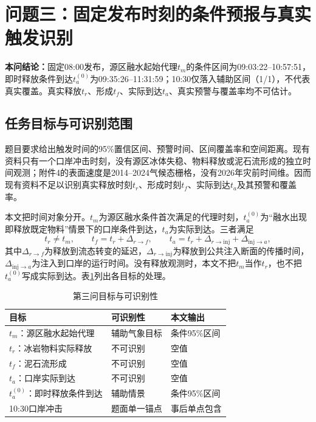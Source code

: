 \section{问题三：固定发布时刻的条件预报与真实触发识别}
\noindent\textbf{本问结论：}固定08:00发布，源区融水起始代理$t_m$的条件区间为09:03:22--10:57:51，即时释放条件到达$t_a^{(0)}$为09:35:26--11:31:59；10:30仅落入辅助区间（1/1），不代表真实覆盖。真实释放$t_r$、形成$t_f$、实际到达$t_a$、真实预警与覆盖率均不可估计。

\subsection{任务目标与可识别范围}
题目要求给出触发时间的95\%置信区间、预警时间、区间覆盖率和空间距离。现有资料只有一个口岸冲击时刻，没有源区冰体失稳、物料释放或泥石流形成的独立时间观测；附件4的表面速度是2014--2024气候态栅格，没有2026年灾前时间维。因而现有资料不足以识别真实释放时刻$t_r$、形成时刻$t_f$、实际到达$t_a$及其预警和覆盖率。

本文把时间对象分开。$t_m$为源区融水条件首次满足的代理时刻，$t_a^{(0)}$为“融水出现即释放既定物料”情景下的口岸条件到达，$t_a$为实际到达。三者满足
\begin{equation}
t_r\ne t_m,\qquad
t_f=t_r+\Delta_{r\to f},\qquad
t_a=t_r+\Delta_{r\to\mathrm{inj}}+\Delta_{\mathrm{inj}\to a},
\label{eq:times}
\end{equation}
其中$\Delta_{r\to f}$为释放到流态转变的延迟，$\Delta_{r\to\mathrm{inj}}$为释放到公共注入断面的传播时间，$\Delta_{\mathrm{inj}\to a}$为注入到口岸的运行时间。没有释放观测时，本文不把$t_m$当作$t_r$，也不把$t_a^{(0)}$写成实际到达。表\ref{tab:q3-targets}列出各目标的处理。

\begin{table}[htbp]\centering\footnotesize
\caption{第三问目标与可识别性}\label{tab:q3-targets}
\begin{tabular}{@{}l l l@{}}\toprule
目标&可识别性&本文输出\\\midrule
$t_m$：源区融水起始代理&辅助气象目标&条件95\%区间\\
$t_r$：冰岩物料实际释放&不可识别&空值\\
$t_f$：泥石流形成&不可识别&空值\\
$t_a$：口岸实际到达&不可识别&空值\\
$t_a^{(0)}$：即时释放条件到达&辅助情景&条件95\%区间\\
10:30口岸冲击&题面单一锚点&事后单点包含\\
\bottomrule
\end{tabular}\end{table}

